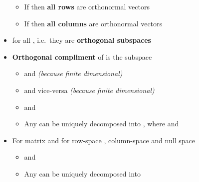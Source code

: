 \begin{itemize}
\begin{itemize}
          \item
                If  then \textbf{all  rows} are orthonormal
                vectors
          \item
                If  then \textbf{all  columns} are orthonormal
                vectors
        \end{itemize}
  \item
        for all , i.e.~they are
        \textbf{orthogonal subspaces}
  \item
        \textbf{Orthogonal compliment} of  is
        the subspace

        \begin{itemize}

          \item
                 and
                 \emph{(because finite dimensional)}
          \item
                 and vice-versa \emph{(because
                  finite dimensional)}
          \item
                 and
          \item
                Any  can be uniquely decomposed
                into , where
                 and
        \end{itemize}
  \item
        For matrix  and for row-space
        , column-space  and null
        space 

        \begin{itemize}

          \item
                 and
          \item
                Any  can be uniquely decomposed
                into


\end{itemize}
\end{itemize}

